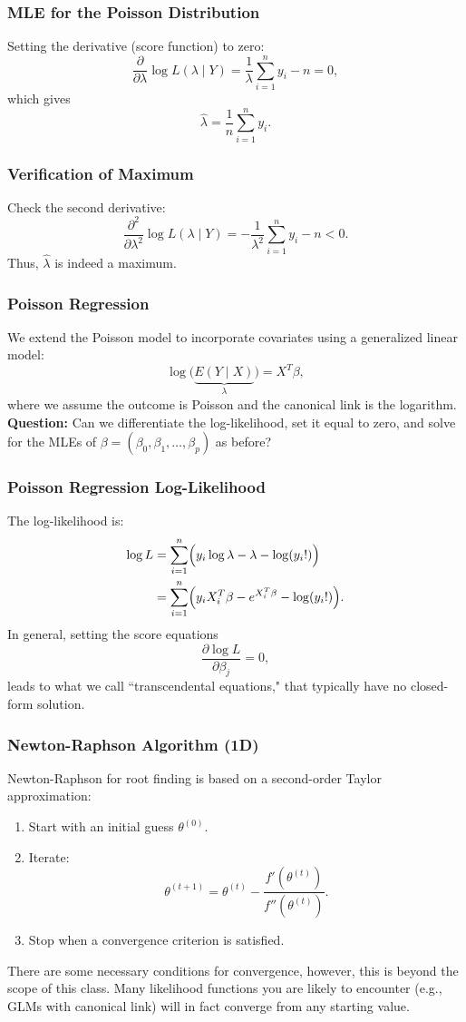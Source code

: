 \documentclass{beamer}
\begin{document}
\begin{frame}
\frametitle{MLE for the Poisson Distribution}
Setting the derivative (score function) to zero:
\[
\frac{\partial}{\partial \lambda} \log L(\lambda \mid Y)
= \frac{1}{\lambda} \sum_{i=1}^n y_i - n = 0,
\]
which gives
\[
\hat{\lambda} = \frac{1}{n} \sum_{i=1}^n y_i.
\]
\end{frame}

\begin{frame}
\frametitle{Verification of Maximum}
Check the second derivative:
\[
\frac{\partial^2}{\partial \lambda^2} \log L(\lambda \mid Y)
= -\frac{1}{\lambda^2} \sum_{i=1}^n y_i - n < 0.
\]
Thus, $\hat{\lambda}$ is indeed a maximum.
\end{frame}


\begin{frame}
\frametitle{Poisson Regression}
We extend the Poisson model to incorporate covariates using a generalized linear model:
\[
\log\bigl(\underbrace{E(Y \mid X)}_{\lambda}\bigr) = X^T \beta,
\]
where we assume the outcome is Poisson and the canonical link is the logarithm.\\[1em]
\textbf{Question:} Can we differentiate the log-likelihood, set it equal to zero, and solve for the MLEs of $\beta = (\beta_0, \beta_1, \dots, \beta_p)$ as before?
\end{frame}

\begin{frame}
\frametitle{Poisson Regression Log-Likelihood}
The log-likelihood is:
\begin{align}
\log L &=  \sum_{i=1}^n \Bigl( y_i \log \lambda - \lambda - \log (y_i!) \Bigr) \\
&= \sum_{i=1}^n \Bigl( y_i X_i^T \beta - e^{X_i^T \beta} - \log (y_i!) \Bigr).
\end{align}
In general, setting the score equations
\[
\frac{\partial \log L}{\partial \beta_j} = 0,
\]
leads to what we call ``transcendental equations," that typically have no closed-form solution.
\end{frame}


\begin{frame}
\frametitle{Newton-Raphson Algorithm (1D)}
Newton-Raphson for root finding is based on a second-order Taylor approximation:
\begin{enumerate}
  \item Start with an initial guess $\theta^{(0)}$.
  \item Iterate:
  \[
  \theta^{(t+1)} = \theta^{(t)} - \frac{f'(\theta^{(t)})}{f''(\theta^{(t)})}.
  \]
  \item Stop when a convergence criterion is satisfied.
\end{enumerate}

There are some necessary conditions for convergence, however, this is beyond the scope of this class. Many likelihood functions you are
likely to encounter (e.g., GLMs with canonical link) will in fact
converge from any starting value.
\end{frame}
\end{document}

